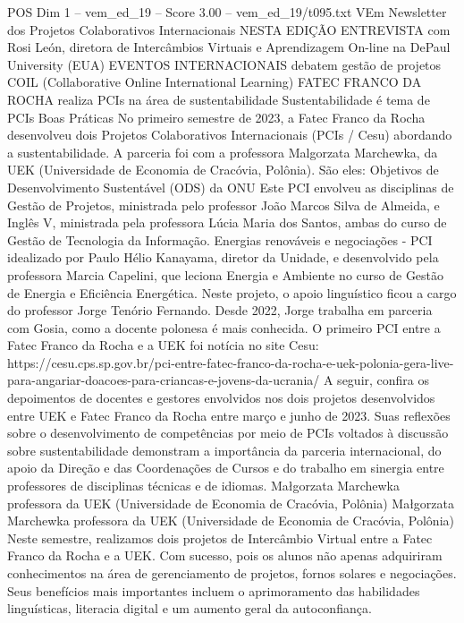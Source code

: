 \begin{textsample}{POS Dim 1 – vem\_ed\_19 – Score 3.00 – vem\_ed\_19/t095.txt}  \label{ex:f1_pos_045}
VEm Newsletter dos Projetos Colaborativos Internacionais NESTA EDIÇÃO ENTREVISTA com Rosi León, diretora de Intercâmbios Virtuais e Aprendizagem On-line na DePaul University (EUA) EVENTOS INTERNACIONAIS debatem gestão de projetos COIL (Collaborative Online International Learning) FATEC FRANCO DA ROCHA realiza PCIs na área de sustentabilidade Sustentabilidade é tema de PCIs Boas Práticas No primeiro semestre de 2023, a Fatec Franco da Rocha desenvolveu dois Projetos Colaborativos Internacionais (PCIs / Cesu) abordando a sustentabilidade.
A parceria foi com a professora Malgorzata Marchewka, da UEK (Universidade de Economia de Cracóvia, Polônia).
São eles: Objetivos de Desenvolvimento Sustentável (ODS) da ONU Este PCI envolveu as disciplinas de Gestão de Projetos, ministrada pelo professor João Marcos Silva de Almeida, e Inglês V, ministrada pela professora Lúcia Maria dos Santos, ambas do curso de Gestão de Tecnologia da Informação.
Energias renováveis e negociações - PCI idealizado por Paulo Hélio Kanayama, diretor da Unidade, e desenvolvido pela professora Marcia Capelini, que leciona Energia e Ambiente no curso de Gestão de Energia e Eficiência Energética.
Neste projeto, o apoio linguístico ficou a cargo do professor Jorge Tenório Fernando.
Desde 2022, Jorge trabalha em parceria com Gosia, como a docente polonesa é mais conhecida.
O primeiro PCI entre a Fatec Franco da Rocha e a UEK foi notícia no site Cesu: https://cesu.cps.sp.gov.br/pci-entre-fatec-franco-da-rocha-e-uek-polonia-gera-live-para-angariar-doacoes-para-criancas-e-jovens-da-ucrania/ A seguir, confira os depoimentos de docentes e gestores envolvidos nos dois projetos desenvolvidos entre UEK e Fatec Franco da Rocha entre março e junho de 2023.
Suas reflexões sobre o desenvolvimento de competências por meio de PCIs voltados à discussão sobre sustentabilidade demonstram a importância da parceria internacional, do apoio da Direção e das Coordenações de Cursos e do trabalho em sinergia entre professores de disciplinas técnicas e de idiomas.
Małgorzata Marchewka professora da UEK (Universidade de Economia de Cracóvia, Polônia) Małgorzata Marchewka professora da UEK (Universidade de Economia de Cracóvia, Polônia) Neste semestre, realizamos dois projetos de Intercâmbio Virtual entre a Fatec Franco da Rocha e a UEK.
Com sucesso, pois os alunos não apenas adquiriram conhecimentos na área de gerenciamento de projetos, fornos solares e negociações.
Seus benefícios mais importantes incluem o aprimoramento das habilidades linguísticas, literacia digital e um aumento geral da autoconfiança.

\end{textsample}
